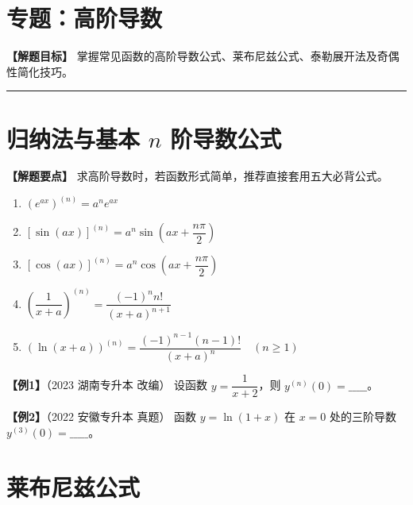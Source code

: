 \documentclass[12pt,a4paper]{article}
\begin{document}
\section*{专题：高阶导数}

\textbf{【解题目标】} 掌握常见函数的高阶导数公式、莱布尼兹公式、泰勒展开法及奇偶性简化技巧。

\rule{\linewidth}{0.5pt}

\section{归纳法与基本 $n$ 阶导数公式}

\textbf{【解题要点】}
求高阶导数时，若函数形式简单，推荐直接套用五大必背公式。

\begin{tcolorbox}[title=\textbf{★ 必背公式表 (建议板书)}, colback=white, colframe=black]
\begin{enumerate}[label=\arabic*)]
    \item $(e^{ax})^{(n)} = a^n e^{ax}$
    \item $[\sin(ax)]^{(n)} = a^n \sin\left(ax + \dfrac{n\pi}{2}\right)$
    \item $[\cos(ax)]^{(n)} = a^n \cos\left(ax + \dfrac{n\pi}{2}\right)$
    \item $\left(\dfrac{1}{x+a}\right)^{(n)} = \dfrac{(-1)^n n!}{(x+a)^{n+1}}$
    \item $(\ln(x+a))^{(n)} = \dfrac{(-1)^{n-1} (n-1)!}{(x+a)^n} \quad (n \geq 1)$
\end{enumerate}
\end{tcolorbox}

\vspace{1em}

\textbf{【例1】}（2023 湖南专升本 改编）
设函数 $y = \dfrac{1}{x+2}$，则 $y^{(n)}(0) = \_\_\_\_\_$。


\vspace{12em}

\textbf{【例2】}（2022 安徽专升本 真题）
函数 $y = \ln(1+x)$ 在 $x=0$ 处的三阶导数 $y^{(3)}(0) = \_\_\_\_\_$。
\vspace{12em}

\newpage

\section{莱布尼兹公式}
\end{document}
